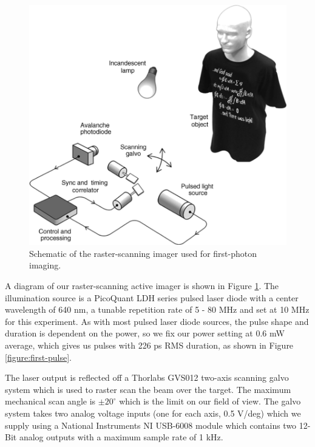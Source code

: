 \begin{figure}[htb]
\centerline{\includegraphics[width=14cm]{figure-first-setup.pdf}}
\caption{Schematic of the raster-scanning imager used for first-photon imaging.}
\label{figure:first-setup}
\end{figure}

A diagram of our raster-scanning active imager is shown in Figure \ref{figure:first-setup}. The illumination source is a PicoQuant LDH series pulsed laser diode with a center wavelength of 640 nm, a tunable repetition rate of 5 - 80 MHz and set at 10 MHz for this experiment. As with most pulsed laser diode sources, the pulse shape and duration is dependent on the power, so we fix our power setting at 0.6 mW average, which gives us pulses with 226 ps RMS duration, as shown in Figure \ref{figure:first-pulse}.

The laser output is reflected off a Thorlabs GVS012 two-axis scanning galvo system which is used to raster scan the beam over the target. The maximum mechanical scan angle is $\pm 20^\circ$ which is the limit on our field of view. The galvo system takes two analog voltage inputs (one for each axis, 0.5 V/deg) which we supply using a National Instruments NI USB-6008 module which contains two 12-Bit analog outputs with a maximum sample rate of 1 kHz.

